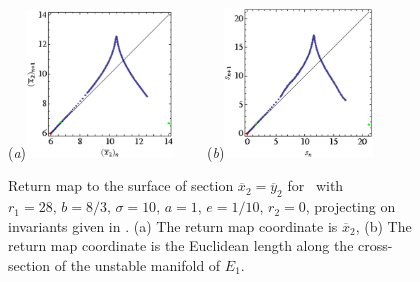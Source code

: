 \begin{figure}[t]
\begin{center}
  (\textit{a})\includegraphics[width=0.35\textwidth]{../figs/CLEinvRMx2.eps}
 ~~~~(\textit{b})\includegraphics[width=0.35\textwidth]{../figs/CLEinvRM.eps}
\end{center}
\caption[\Poincare return map for Complex Lorenz equations]{Return map to the \Poincare
surface of section $\overline{x}_2=\overline{y}_2$ for \CLe\ with $r_1=28,\, b=8/3,\, \sigma=10,\, a=1$, $e=1/10$, $r_2=0$,
projecting on invariants given in . (a) The return map coordinate is
$\overline{x}_2$, (b) The return map coordinate is the Euclidean
length along the \Poincare cross-section of the unstable manifold of $E_1$.
    }
\label{fig:CLEinvRM}
\end{figure}


